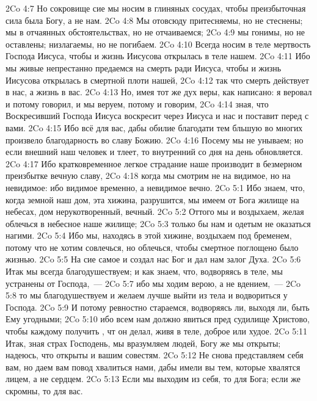 \rsbpar\vs 2Co 4:7 Но сокровище сие мы носим в глиняных сосудах, чтобы преизбыточная сила была  Богу, а не нам.
\vs 2Co 4:8 Мы отовсюду притесняемы, но не стеснены; мы в отчаянных обстоятельствах, но не отчаиваемся;
\vs 2Co 4:9 мы гонимы, но не оставлены; низлагаемы, но не погибаем.
\vs 2Co 4:10 Всегда носим в теле мертвость Господа Иисуса, чтобы и жизнь Иисусова открылась в теле нашем.
\vs 2Co 4:11 Ибо мы живые непрестанно предаемся на смерть ради Иисуса, чтобы и жизнь Иисусова открылась в смертной плоти нашей,
\vs 2Co 4:12 так что смерть действует в нас, а жизнь в вас.
\vs 2Co 4:13 Но, имея тот же дух веры, как написано: я веровал и потому говорил, и мы веруем, потому и говорим,
\vs 2Co 4:14 зная, что Воскресивший Господа Иисуса воскресит через Иисуса и нас и поставит перед  с вами.
\vs 2Co 4:15 Ибо всё для вас, дабы обилие благодати тем бльшую во многих произвело благодарность во славу Божию.
\vs 2Co 4:16 Посему мы не унываем; но если внешний наш человек и тлеет, то внутренний со дня на день обновляется.
\vs 2Co 4:17 Ибо кратковременное легкое страдание наше производит в безмерном преизбытке вечную славу,
\vs 2Co 4:18 когда мы смотрим не на видимое, но на невидимое: ибо видимое временно, а невидимое вечно.
\vs 2Co 5:1 Ибо знаем, что, когда земной наш дом, эта хижина, разрушится, мы имеем от Бога жилище на небесах, дом нерукотворенный, вечный.
\vs 2Co 5:2 Оттого мы и воздыхаем, желая облечься в небесное наше жилище;
\vs 2Co 5:3 только бы нам и одетым не оказаться нагими.
\vs 2Co 5:4 Ибо мы, находясь в этой хижине, воздыхаем под бременем, потому что не хотим совлечься, но облечься, чтобы смертное поглощено было жизнью.
\vs 2Co 5:5 На сие самое и создал нас Бог и дал нам залог Духа.
\vs 2Co 5:6 Итак мы всегда благодушествуем; и как знаем, что, водворяясь в теле, мы устранены от Господа,~---
\vs 2Co 5:7 ибо мы ходим верою, а не вдением,~---
\vs 2Co 5:8 то мы благодушествуем и желаем лучше выйти из тела и водвориться у Господа.
\vs 2Co 5:9 И потому ревностно стараемся, водворяясь ли, выходя ли, быть Ему угодными;
\vs 2Co 5:10 ибо всем нам должно явиться пред судилище Христово, чтобы каждому получить , чт он делал, живя в теле, доброе или худое.
\rsbpar\vs 2Co 5:11 Итак, зная страх Господень, мы вразумляем людей, Богу же мы открыты; надеюсь, что открыты и вашим совестям.
\vs 2Co 5:12 Не снова представляем себя вам, но даем вам повод хвалиться нами, дабы имели вы  тем, которые хвалятся лицем, а не сердцем.
\vs 2Co 5:13 Если мы выходим из себя, то для Бога; если же скромны, то для вас.
